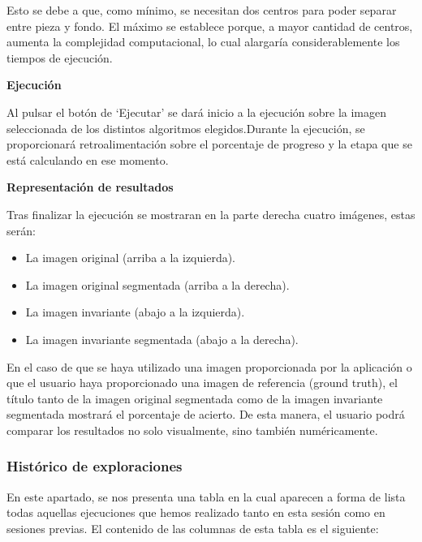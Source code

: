 Esto se debe a que, como mínimo, se necesitan dos centros para poder separar entre pieza y fondo. El máximo se establece porque, a mayor cantidad de centros, aumenta la complejidad computacional, lo cual alargaría considerablemente los tiempos de ejecución.

\textbf{Ejecución}\label{ejecución}

Al pulsar el botón de `Ejecutar' se dará inicio a la ejecución sobre la imagen seleccionada de los distintos algoritmos elegidos.Durante la ejecución, se proporcionará retroalimentación sobre el porcentaje de progreso y la etapa que se está calculando en ese momento.

\textbf{Representación de resultados}\label{representación-de-resultados}

Tras finalizar la ejecución se mostraran en la parte derecha cuatro imágenes, estas serán:

\begin{itemize}
    \item La imagen original (arriba a la izquierda).
    \item La imagen original segmentada (arriba a la derecha).
    \item La imagen invariante (abajo a la izquierda).
    \item La imagen invariante segmentada (abajo a la derecha).
\end{itemize}

En el caso de que se haya utilizado una imagen proporcionada por la aplicación o que el usuario haya proporcionado una imagen de referencia (ground truth), el título tanto de la imagen original segmentada como de la imagen invariante segmentada mostrará el porcentaje de acierto. De esta manera, el usuario podrá comparar los resultados no solo visualmente, sino también numéricamente.

\subsubsection{Histórico de exploraciones}\label{Histórico-de-exploraciones}

En este apartado, se nos presenta una tabla en la cual aparecen a forma de lista todas aquellas ejecuciones que hemos realizado tanto en esta sesión como en sesiones previas. El contenido de las columnas de esta tabla es el siguiente:

